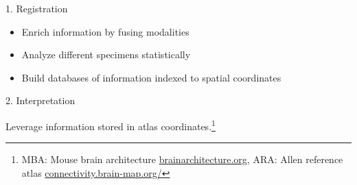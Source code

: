 \documentclass{beamer}
\begin{document}
\begin{frame}{1. Registration}
\begin{itemize}
\item 
Enrich information by fusing modalities


\item
Analyze different specimens statistically

\item 
Build databases of information indexed to spatial coordinates

\end{itemize}

\end{frame}



\begin{frame}{2. Interpretation}


Leverage information stored in atlas coordinates.\footnote{MBA: Mouse brain architecture \url{brainarchitecture.org}, ARA: Allen reference atlas \url{connectivity.brain-map.org/}}


\end{frame}
\end{document}

